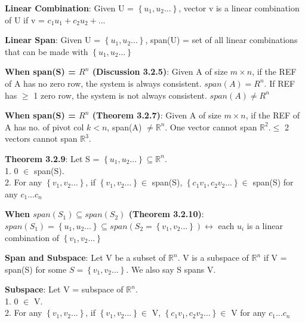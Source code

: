 \documentclass[a4paper,landscape]{article}
\newcommand{\rnname}[1]{\textbf{#1}}
\begin{document}
\begin{multicols*}{4}
\begin{flatitemize}
\item \rnname{Linear Combination}: Given U = $\left\lbrace u_{1}, u_{2} ... \right\rbrace$, vector v is a linear combination of U if v = $ c_{1}u_{1} + c_{2}u_{2} + ...$
\item \rnname{Linear Span}: Given U = $\left\lbrace u_{1}, u_{2} ... \right\rbrace$, span(U) = set of all linear combinations that can be made with $\left\lbrace u_{1}, u_{2} ... \right\rbrace $
\item \rnname{When span(S) = $R^n$ (Discussion 3.2.5)}: Given A of size $m \times n$, if the REF of A has no zero row, the system is always consistent. $span(A) = R^n$. If REF has $\geq$ 1 zero row, the system is not always consistent. $span(A) \neq R^n$ 
\item \rnname{When span(S) = $R^n$ (Theorem 3.2.7)}: Given A of size $m \times n$, if the REF of A has no. of pivot col $k < n$, span(A) $\neq \mathbb{R}^n$. One vector cannot span $\mathbb{R}^2. \leq$ 2 vectors cannot span $\mathbb{R}^3$. 
\item \rnname{Theorem 3.2.9}: Let S = $\left\lbrace u_{1}, u_{2} ... \right\rbrace \subseteq \mathbb{R}^n$.\\
1. 0 $\in$ span(S).\\
2. For any $\left\lbrace v_{1}, v_{2} ... \right\rbrace$, if $\left\lbrace v_{1}, v_{2} ... \right\rbrace \in $ span(S), $\left\lbrace c_{1}v_{1}, c_{2}v_{2} ... \right\rbrace \in $ span(S) for any $c_{1} ... c_{n}$
\item \rnname{When $span(S_{1}) \subseteq span(S_{2})$ (Theorem 3.2.10)}: $span(S_{1}) = \left\lbrace u_{1}, u_{2} ... \right\rbrace \subseteq span(S_{2} = \left\lbrace v_{1}, v_{2} ... \right\rbrace) \leftrightarrow $ each $u_{i}$ is a linear combination of $ \left\lbrace v_{1}, v_{2} ... \right\rbrace $

\item \rnname{Span and Subspace}: Let V be a subset of $\mathbb{R}^n$. V is a subspace of $\mathbb{R}^n$ if V = span(S) for some $S = \left\lbrace v_{1}, v_{2} ... \right\rbrace$. We also say S spans V. 
\item \rnname{Subspace}: Let V = subspace of $ \mathbb{R}^n$.\\
1. 0 $\in$ V.\\
2. For any $\left\lbrace v_{1}, v_{2} ... \right\rbrace$, if $\left\lbrace v_{1}, v_{2} ... \right\rbrace \in $ V, $\left\lbrace c_{1}v_{1}, c_{2}v_{2} ... \right\rbrace \in $ V for any $c_{1} ... c_{n}$


\end{flatitemize}
\end{multicols*}
\end{document}
